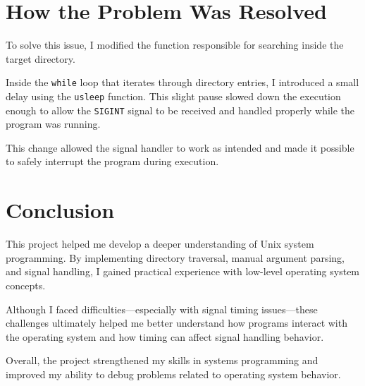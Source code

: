 \documentclass[12pt]{article}
\begin{document}
\section{How the Problem Was Resolved}

To solve this issue, I modified the function responsible for searching inside the target directory.

Inside the \texttt{while} loop that iterates through directory entries, I introduced a small delay using the \texttt{usleep} function. This slight pause slowed down the execution enough to allow the \texttt{SIGINT} signal to be received and handled properly while the program was running.

This change allowed the signal handler to work as intended and made it possible to safely interrupt the program during execution.

\section{Conclusion}

This project helped me develop a deeper understanding of Unix system programming. By implementing directory traversal, manual argument parsing, and signal handling, I gained practical experience with low-level operating system concepts.

Although I faced difficulties---especially with signal timing issues---these challenges ultimately helped me better understand how programs interact with the operating system and how timing can affect signal handling behavior.

Overall, the project strengthened my skills in systems programming and improved my ability to debug problems related to operating system behavior.
\end{document}
